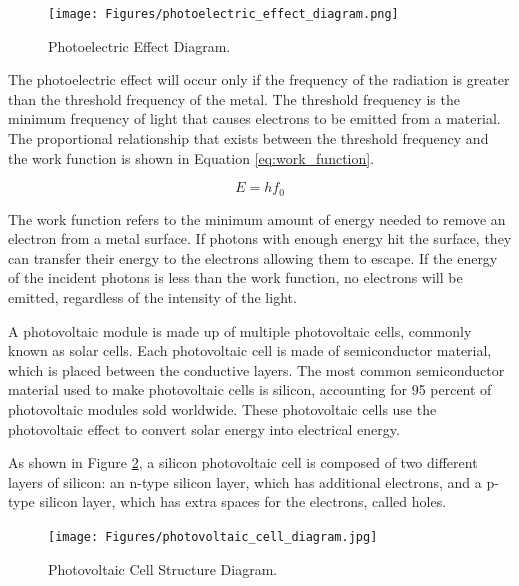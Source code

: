 \begin{figure}[ht]
    \centering
    \texttt{[image: Figures/photoelectric\_effect\_diagram.png]}
    \caption{Photoelectric Effect Diagram. \cite{KhanAcademyPhotoelectricEffect}}
    \label{fig:photoelectric_effect_diagram}
\end{figure}
\FloatBarrier

The photoelectric effect will occur only if the frequency of the radiation is greater than the threshold frequency of the metal. The threshold frequency is the minimum frequency of light that causes electrons to be emitted from a material. The proportional relationship that exists between the threshold frequency and the work function is shown in Equation \ref{eq:work_function}.

\begin{equation}
    E = hf_0
    \label{eq:work_function}
\end{equation}

The work function refers to the minimum amount of energy needed to remove an electron from a metal surface. If photons with enough energy hit the surface, they can transfer their energy to the electrons allowing them to escape. If the energy of the incident photons is less than the work function, no electrons will be emitted, regardless of the intensity of the light. \cite{ScienceABC2023PhotoelectricBeginners}\vspace{0.5em}

A photovoltaic module is made up of multiple photovoltaic cells, commonly known as solar cells. Each photovoltaic cell is made of semiconductor material, which is placed between the conductive layers. The most common semiconductor material used to make photovoltaic cells is silicon, accounting for 95 percent of photovoltaic modules sold worldwide. \cite{U.S.DEPARTMENTofENERGYSolarBasics} These photovoltaic cells use the photovoltaic effect to convert solar energy into electrical energy.\vspace{0.5em}

As shown in Figure \ref{fig:photovoltaic_cell_diagram}, a silicon photovoltaic cell is composed of two different layers of silicon: an n-type silicon layer, which has additional electrons, and a p-type silicon layer, which has extra spaces for the electrons, called holes.\vspace{0.5em}

\begin{figure}[ht]
    \centering
    \texttt{[image: Figures/photovoltaic\_cell\_diagram.jpg]}
    \caption{Photovoltaic Cell Structure Diagram. \cite{Gupta2020SolarVehicle}}
    \label{fig:photovoltaic_cell_diagram}
\end{figure}
\FloatBarrier

